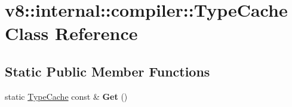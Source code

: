 \hypertarget{classv8_1_1internal_1_1compiler_1_1TypeCache}{}\section{v8\+:\+:internal\+:\+:compiler\+:\+:Type\+Cache Class Reference}
\label{classv8_1_1internal_1_1compiler_1_1TypeCache}
\subsection*{Static Public Member Functions}
\begin{DoxyCompactItemize}
\item 
\mbox{\label{classv8_1_1internal_1_1compiler_1_1TypeCache_a265bab531a70d331ccb675f9a32a1fe0}} 
static \mbox{\hyperlink{classv8_1_1internal_1_1compiler_1_1TypeCache}{Type\+Cache}} const  \& {\bfseries Get} ()
\end{DoxyCompactItemize}
